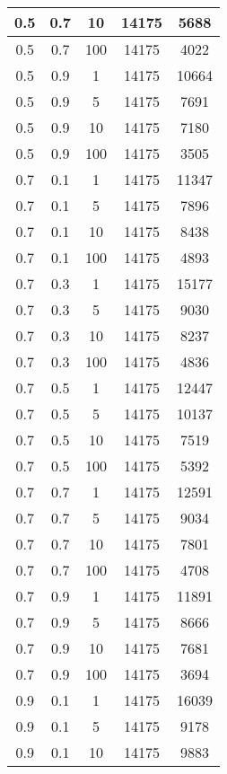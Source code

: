\begin{appendices}
\begin{longtable}{|c|c|c|c|c|}
		0.5   & 0.7    & 10   & 14175 & 5688  \\ \hline
		0.5   & 0.7    & 100  & 14175 & 4022  \\ \hline
		0.5   & 0.9    & 1    & 14175 & 10664 \\ \hline
		0.5   & 0.9    & 5    & 14175 & 7691  \\ \hline
		0.5   & 0.9    & 10   & 14175 & 7180  \\ \hline
		0.5   & 0.9    & 100  & 14175 & 3505  \\ \hline
		0.7   & 0.1    & 1    & 14175 & 11347 \\ \hline
		0.7   & 0.1    & 5    & 14175 & 7896  \\ \hline
		0.7   & 0.1    & 10   & 14175 & 8438  \\ \hline
		0.7   & 0.1    & 100  & 14175 & 4893  \\ \hline
		0.7   & 0.3    & 1    & 14175 & 15177 \\ \hline
		0.7   & 0.3    & 5    & 14175 & 9030  \\ \hline
		0.7   & 0.3    & 10   & 14175 & 8237  \\ \hline
		0.7   & 0.3    & 100  & 14175 & 4836  \\ \hline
		0.7   & 0.5    & 1    & 14175 & 12447 \\ \hline
		0.7   & 0.5    & 5    & 14175 & 10137 \\ \hline
		0.7   & 0.5    & 10   & 14175 & 7519  \\ \hline
		0.7   & 0.5    & 100  & 14175 & 5392  \\ \hline
		0.7   & 0.7    & 1    & 14175 & 12591 \\ \hline
		0.7   & 0.7    & 5    & 14175 & 9034  \\ \hline
		0.7   & 0.7    & 10   & 14175 & 7801  \\ \hline
		0.7   & 0.7    & 100  & 14175 & 4708  \\ \hline
		0.7   & 0.9    & 1    & 14175 & 11891 \\ \hline
		0.7   & 0.9    & 5    & 14175 & 8666  \\ \hline
		0.7   & 0.9    & 10   & 14175 & 7681  \\ \hline
		0.7   & 0.9    & 100  & 14175 & 3694  \\ \hline
		0.9   & 0.1    & 1    & 14175 & 16039 \\ \hline
		0.9   & 0.1    & 5    & 14175 & 9178  \\ \hline
		0.9   & 0.1    & 10   & 14175 & 9883  \\ \hline

\end{longtable}
\end{appendices}
